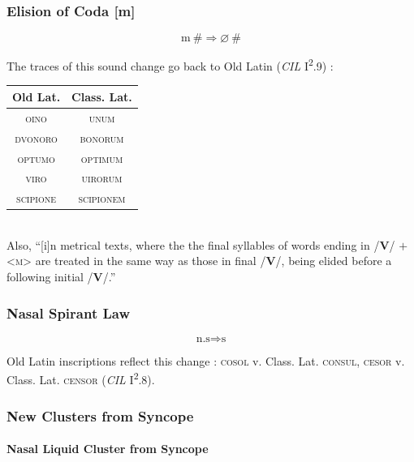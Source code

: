 \documentclass{report}[12pt]
\begin{document}
\subsubsection*{Elision of Coda [m]}

\begin{tcolorbox}
  \[ \text{m}\ \# \Rightarrow \varnothing\ \# \]
\end{tcolorbox}

The traces of this sound change go back to Old Latin (\emph{CIL} I\textsuperscript{2}.9) \parencite[p.~17]{companion_to_latin}: \\
\begin{tabular}{c c}
  Old Lat. & Class. Lat. \\
  \hline
  \textsc{oino} & \textsc{unum} \\
  \textsc{dvonoro} & \textsc{bonorum} \\
  \textsc{optumo} & \textsc{optimum} \\
  \textsc{viro} & \textsc{uirorum} \\
  \textsc{scipione} & \textsc{scipionem} \\
\end{tabular} \\
Also, ``[i]n metrical texts, where the the final syllables of words ending in /\textbf{V}/ $+$ <\textsc{m}> are treated in the same way as those in final /\textbf{V}/, being elided before a following initial /\textbf{V}/.'' \parencite[p.~87]{companion_to_latin}

\subsubsection*{Nasal Spirant Law}

\begin{tcolorbox}
  \[ \text{n.s} \Rightarrow \text{s} \]
\end{tcolorbox}

Old Latin inscriptions reflect this change \parencite[p.~17]{companion_to_latin}: \textsc{cosol} v. Class. Lat. \textsc{consul}, \textsc{cesor} v. Class. Lat. \textsc{censor} (\emph{CIL} I\textsuperscript{2}.8).

\subsubsection*{New Clusters from Syncope}

\paragraph*{Nasal Liquid Cluster from Syncope}
\end{document}
